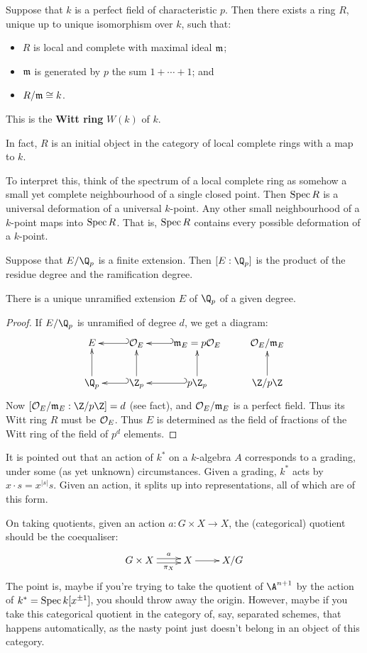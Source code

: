 \documentclass[11pt]{article}
\begin{document}
\begin{thm*}
Suppose that $k$ is a perfect field of characteristic $p$. Then there exists a
ring $R$, unique up to unique isomorphism \lparen over $k$\rparen, such that:
\begin{itemize}\squishlist
\item $R$ is local and complete with maximal ideal $\mathfrak{m}$;
\item $\mathfrak{m}$ is generated by $p$ \lparen the sum $1+\cdots+1$\rparen; and
\item $R/\mathfrak{m}\cong k$.
\end{itemize}
This is the \textbf{Witt ring} $W(k)$ of $k$.

In fact, $R$ is an initial object in the category of local complete rings with a
map to $k$.
\end{thm*}
\noindent To interpret this, think of the spectrum of a local complete ring as
somehow a small yet complete neighbourhood of a single closed point. Then $\operatorname{Spec}
R$ is a universal deformation of a universal $k$-point. Any other small
neighbourhood of a $k$-point maps into $\operatorname{Spec} R$. That is, $\operatorname{Spec} R$ contains
every possible deformation of a $k$-point.
\begin{fact*}
Suppose that $E/\Q_p$ is a finite extension. Then $[E:\Q_p]$ is the product of
the residue degree and the ramification degree.
\end{fact*}
\begin{cor*}
There is a unique unramified extension $E$ of $\Q_p$ of a given degree.
\end{cor*}
\begin{proof}
If $E/\Q_p$ is unramified of degree $d$, we get a diagram:
\[\xymatrix{
E&\calO_E\ar@{_{(}->}[l]&\frakm_E=p\calO_E\ar@{_{(}->}[l]&\calO_E/\frakm_E\\
\Q_p\ar[u]&\Z_p\ar@{_{(}->}[l]\ar[u]&p\Z_p\ar@{_{(}->}
[l]\ar[u]&\Z/p\Z\ar[u]
}\]
Now $[\calO_E/\frakm_E:\Z/p\Z]=d$ (see fact), and $\mathcal{O}_E/\mathfrak{m}_E$ is a
perfect field. Thus its Witt ring $R$ must be $\mathcal{O}_E$. Thus $E$ is determined
as the field of fractions of the Witt ring of the field of $p^d$ elements.
\end{proof}
It is pointed out that an action of $k^*$ on a $k$-algebra $A$ corresponds to a
grading, under some (as yet unknown) circumstances. Given a grading, $k^*$ acts
by $x\cdot s=x^{|s|}s$. Given an action, it splits up into representations, all
of which are of this form.

On taking quotients, given an action $a:G\times X\to X$, the (categorical)
quotient should be the coequaliser:
\[\xymatrix{
G\times X\ar@<.5ex>[r]^{\ \ \ a}\ar@<-.5ex>[r]_{\ \ \ \pi_X}&X\ar[r]&X/G
}\]
The point is, maybe if you're trying to take the quotient of $\A^{n+1}$ by the
action of $k^*=\operatorname{Spec} k[x^{\pm1}]$, you should throw away the origin. However,
maybe if you take this categorical quotient in the category of, say, separated
schemes, that happens automatically, as the nasty point just doesn't belong in
an object of this category.
\end{document}
